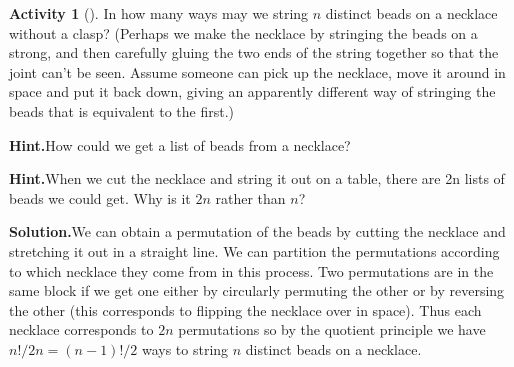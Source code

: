 \documentclass[10pt,]{book}
\theoremstyle{plain}
\theoremstyle{definition}
\newtheorem{activity}[project]{Activity}
\numberwithin{equation}{chapter}
\begin{document}
\begin{activity}[]\label{necklace}
In how many ways may we string \(n\) distinct beads on a necklace without a clasp? (Perhaps we make the necklace by stringing the beads on a strong, and then carefully gluing the two ends of the string together so that the joint can't be seen. Assume someone can pick up the necklace, move it around in space and put it back down, giving an apparently different way of stringing the beads that is equivalent to the first.)%
\par\medskip\noindent%
\textbf{Hint.}\quad How could we get a list of beads from a necklace?\par\medskip\noindent%
\textbf{Hint.}\quad When we cut the necklace and string it out on a table, there are 2n lists of beads we could get. Why is it \(2n\) rather than \(n\)?\par\medskip\noindent%
\textbf{Solution.}\quad We can obtain a permutation of the beads by cutting the necklace and stretching it out in a straight line. We can partition the permutations according to which necklace they come from in this process. Two permutations are in the same block if we get one either by circularly permuting the other or by reversing the other (this corresponds to flipping the necklace over in space). Thus each necklace corresponds to \(2n\) permutations so by the quotient principle we have \(n!/2n=(n-1)!/2\) ways to string \(n\) distinct beads on a necklace.%
\end{activity}
\end{document}
